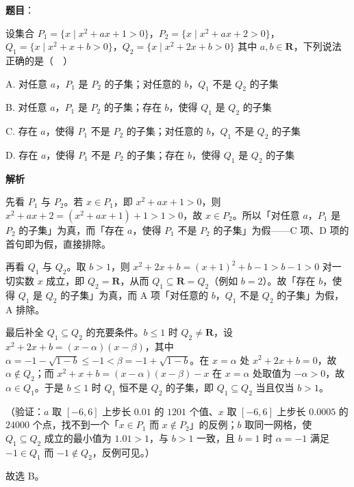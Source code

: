 \begin{answer}

\textbf{题目}：

设集合 \(P_{1}=\{x\mid x^{2}+ax+1>0\}\)，\(P_{2}=\{x\mid x^{2}+ax+2>0\}\)，\(Q_{1}=\{x\mid x^{2}+x+b>0\}\)，\(Q_{2}=\{x\mid x^{2}+2x+b>0\}\) 其中 \(a,b\in\mathbf{R}\)，下列说法正确的是（　）

A. 对任意 \(a\)，\(P_{1}\) 是 \(P_{2}\) 的子集；对任意的 \(b\)，\(Q_{1}\) 不是 \(Q_{2}\) 的子集

B. 对任意 \(a\)，\(P_{1}\) 是 \(P_{2}\) 的子集；存在 \(b\)，使得 \(Q_{1}\) 是 \(Q_{2}\) 的子集

C. 存在 \(a\)，使得 \(P_{1}\) 不是 \(P_{2}\) 的子集；对任意的 \(b\)，\(Q_{1}\) 不是 \(Q_{2}\) 的子集

D. 存在 \(a\)，使得 \(P_{1}\) 不是 \(P_{2}\) 的子集；存在 \(b\)，使得 \(Q_{1}\) 是 \(Q_{2}\) 的子集

\textbf{解析}

先看 \(P_{1}\) 与 \(P_{2}\)。若 \(x\in P_{1}\)，即 \(x^{2}+ax+1>0\)，则 \(x^{2}+ax+2=(x^{2}+ax+1)+1>1>0\)，故 \(x\in P_{2}\)。所以「对任意 \(a\)，\(P_{1}\) 是 \(P_{2}\) 的子集」为真，而「存在 \(a\)，使得 \(P_{1}\) 不是 \(P_{2}\) 的子集」为假——C 项、D 项的首句即为假，直接排除。

再看 \(Q_{1}\) 与 \(Q_{2}\)。取 \(b>1\)，则 \(x^{2}+2x+b=(x+1)^{2}+b-1>b-1>0\) 对一切实数 \(x\) 成立，即 \(Q_{2}=\mathbf{R}\)，从而 \(Q_{1}\subseteq\mathbf{R}=Q_{2}\)（例如 \(b=2\)）。故「存在 \(b\)，使得 \(Q_{1}\) 是 \(Q_{2}\) 的子集」为真，而 A 项「对任意的 \(b\)，\(Q_{1}\) 不是 \(Q_{2}\) 的子集」为假，A 排除。

最后补全 \(Q_{1}\subseteq Q_{2}\) 的充要条件。\(b\leqslant1\) 时 \(Q_{2}\neq\mathbf{R}\)，设 \(x^{2}+2x+b=(x-\alpha)(x-\beta)\)，其中 \(\alpha=-1-\sqrt{1-b}\leqslant-1<\beta=-1+\sqrt{1-b}\)。在 \(x=\alpha\) 处 \(x^{2}+2x+b=0\)，故 \(\alpha\notin Q_{2}\)；而 \(x^{2}+x+b=(x-\alpha)(x-\beta)-x\) 在 \(x=\alpha\) 处取值为 \(-\alpha>0\)，故 \(\alpha\in Q_{1}\)。于是 \(b\leqslant1\) 时 \(Q_{1}\) 恒不是 \(Q_{2}\) 的子集，即 \(Q_{1}\subseteq Q_{2}\) 当且仅当 \(b>1\)。

（验证：\(a\) 取 \([-6,6]\) 上步长 \(0.01\) 的 \(1201\) 个值、\(x\) 取 \([-6,6]\) 上步长 \(0.0005\) 的 \(24000\) 个点，找不到一个「\(x\in P_{1}\) 而 \(x\notin P_{2}\)」的反例；\(b\) 取同一网格，使 \(Q_{1}\subseteq Q_{2}\) 成立的最小值为 \(1.01>1\)，与 \(b>1\) 一致，且 \(b=1\) 时 \(\alpha=-1\) 满足 \(-1\in Q_{1}\) 而 \(-1\notin Q_{2}\)，反例可见。）

故选 B。


\end{answer}
